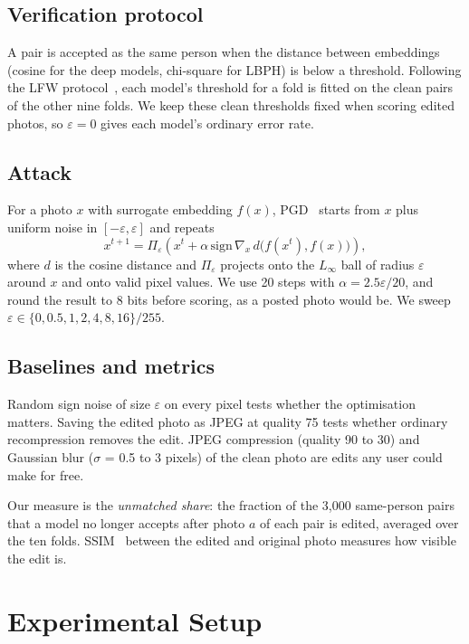 \documentclass[conference]{IEEEtran}
\begin{document}
\subsection{Verification protocol}
A pair is accepted as the same person when the distance between embeddings (cosine for the deep models,
chi-square for LBPH) is below a threshold. Following the LFW protocol~\cite{lfw}, each model's threshold for a fold is fitted
on the clean pairs of the other nine folds. We keep these clean thresholds fixed when scoring edited photos, so
$\varepsilon = 0$ gives each model's ordinary error rate.

\subsection{Attack}
For a photo $x$ with surrogate embedding $f(x)$, PGD~\cite{madry} starts from $x$ plus uniform noise in
$[-\varepsilon, \varepsilon]$ and repeats
\begin{equation}
x^{t+1} = \Pi_{\varepsilon}\!\left(x^{t} + \alpha \,\mathrm{sign}\, \nabla_{x}\, d\big(f(x^{t}), f(x)\big)\right),
\end{equation}
where $d$ is the cosine distance and $\Pi_\varepsilon$ projects onto the $L_\infty$ ball of radius $\varepsilon$
around $x$ and onto valid pixel values. We use 20 steps with $\alpha = 2.5\varepsilon/20$, and round the result to
8 bits before scoring, as a posted photo would be. We sweep $\varepsilon \in \{0, 0.5, 1, 2, 4, 8, 16\}/255$.

\subsection{Baselines and metrics}
Random sign noise of size $\varepsilon$ on every pixel tests whether the optimisation matters. Saving the edited
photo as JPEG at quality 75 tests whether ordinary recompression removes the edit. JPEG compression (quality 90 to
30) and Gaussian blur ($\sigma$ = 0.5 to 3 pixels) of the clean photo are edits any user could make for free.

Our measure is the \emph{unmatched share}: the fraction of the 3,000 same-person pairs that a model no longer
accepts after photo $a$ of each pair is edited, averaged over the ten folds. SSIM~\cite{ssim} between the edited
and original photo measures how visible the edit is.

\section{Experimental Setup}
\end{document}
